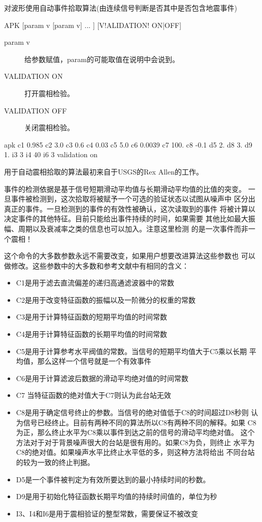 \label{cmd:apk}

对波形使用自动事件拾取算法(由连续信号判断是否其中是否包含地震事件)

\begin{SACSTX}
APK [param v [param v] ... ] [V!ALIDATION! ON|OFF]
\end{SACSTX}

\begin{description}
\item [param v] 给参数赋值，param的可能取值在说明中会说到。
\item [VALIDATION ON] 打开震相检验。
\item [VALIDATION OFF] 关闭震相检验。
\end{description}

\begin{SACDFT}
apk c1 0.985 c2 3.0 c3 0.6 c4 0.03 c5 5.0 c6 0.0039 c7 100. c8 -0.1
    d5 2. d8 3. d9 1. i3 3 i4 40 i6 3 validation on
\end{SACDFT}

用于自动震相拾取的算法最初来自于USGS的Rex Allen的工作。

事件的检测依据是基于信号短期滑动平均值与长期滑动平均值的比值的突变。
一旦事件被检测到，这次拾取将被赋予一个可选的验证状态以试图从噪声中
区分出真正的事件。一旦检测到的事件的有效性被确认，这次读取到的事件
将被计算以决定事件的其他特征。目前只能给出事件持续的时间，如果需要
其他比如最大振幅、周期以及衰减率之类的信息也可以加入。注意这里检测
的是一次事件而非一个震相！

这个命令的大多数参数永远不需要改变，如果用户想要改进算法这些参数也
可以做修改。这些参数中的大多数和参考文献中有相同的含义：
\begin{itemize}
\item C1是用于滤去直流偏差的递归高通滤波器中的常数
\item C2是用于改变特征函数的振幅以及一阶微分的权重的常数
\item C3是用于计算特征函数的短期平均值的时间常数
\item C4是用于计算特征函数的长期平均值的时间常数
\item C5是用于计算参考水平阀值的常数。当信号的短期平均值大于C5乘以长期
    平均值，那么这样一个信号就是一个有效事件
\item C6是用于计算滤波后数据的滑动平均绝对值的时间常数
\item C7 当特征函数的绝对值大于C7则认为此台站无效
\item C8是用于确定信号终止的参数。当信号的绝对值低于C8的时间超过D8秒则
    认为信号已经终止。目前有两种不同的算法所以C8有两种不同的解释。如果
    C8为正，那么终止水平为C8乘以事件到达之前的信号的滑动平均绝对值。
    这个方法对于对于背景噪声很大的台站是很有用的。如果C8为负，则终止
    水平为C8的绝对值。如果噪声水平比终止水平低的多，则这种方法将给出
    不同台站的较为一致的终止判据。
\item D5是一个事件被判定为有效所要达到的最小持续时间的秒数。
\item D9是用于初始化特征函数长期平均值的持续时间值的，单位为秒
\item I3、I4和I6是用于震相验证的整型常数，需要保证不被改变
\end{itemize}

